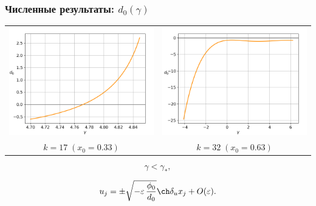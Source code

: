 \documentclass[fullscreen=true, unicode, bookmarks=false]{beamer}
\begin{document}
\begin{frame}
\frametitle{ Численные результаты: $ d_0(\gamma) $ }

\begin{center}
\begin{tabular}{cc}
\includegraphics[scale=0.32]{divergent_d0_033.png} &
\includegraphics[scale=0.32]{divergent_d0_063.png} \\
\small{$k=17\;(x_0=0.33)$ } & \small{$k=32\;(x_0=0.63)$ } \\
\end{tabular}
\end{center}

\vfill

$$ \gamma<\gamma_*, $$

\vfill

\begin{equation}\label{asymptotic_div}
    u_j = \pm \sqrt{-\varepsilon \, \dfrac{\phi_0}{d_0}} \ch \delta_u x_j + O(\varepsilon).
\end{equation}

\end{frame}
\end{document}
